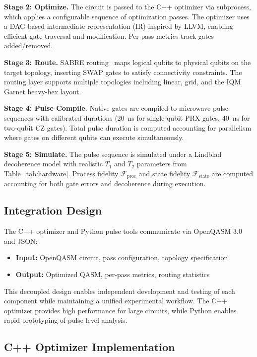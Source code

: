 \documentclass[journal]{IEEEtran}
\newcommand{\fid}{\mathcal{F}}
\begin{document}
\textbf{Stage 2: Optimize.} The circuit is passed to the C++ optimizer via subprocess, which applies a configurable sequence of optimization passes. The optimizer uses a DAG-based intermediate representation (IR) inspired by LLVM, enabling efficient gate traversal and modification. Per-pass metrics track gates added/removed.

\textbf{Stage 3: Route.} SABRE routing~\cite{li2019tackling} maps logical qubits to physical qubits on the target topology, inserting SWAP gates to satisfy connectivity constraints. The routing layer supports multiple topologies including linear, grid, and the IQM Garnet heavy-hex layout.

\textbf{Stage 4: Pulse Compile.} Native gates are compiled to microwave pulse sequences with calibrated durations (\SI{20}{\nano\second} for single-qubit PRX gates, \SI{40}{\nano\second} for two-qubit CZ gates). Total pulse duration is computed accounting for parallelism where gates on different qubits can execute simultaneously.

\textbf{Stage 5: Simulate.} The pulse sequence is simulated under a Lindblad decoherence model with realistic $T_1$ and $T_2$ parameters from Table~\ref{tab:hardware}. Process fidelity $\fid_{\text{proc}}$ and state fidelity $\fid_{\text{state}}$ are computed accounting for both gate errors and decoherence during execution.

\subsection{Integration Design}

The C++ optimizer and Python pulse tools communicate via OpenQASM 3.0 and JSON:
\begin{itemize}
    \item \textbf{Input:} OpenQASM circuit, pass configuration, topology specification
    \item \textbf{Output:} Optimized QASM, per-pass metrics, routing statistics
\end{itemize}

This decoupled design enables independent development and testing of each component while maintaining a unified experimental workflow. The C++ optimizer provides high performance for large circuits, while Python enables rapid prototyping of pulse-level analysis.

\subsection{C++ Optimizer Implementation}
\end{document}
